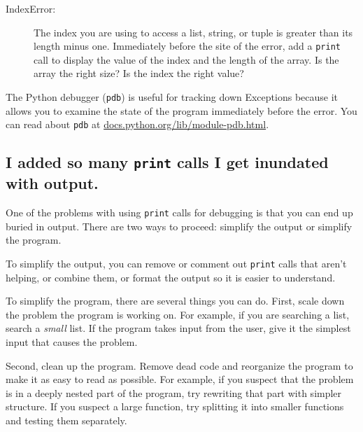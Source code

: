 \documentclass[10pt]{book}
\begin{document}
\begin{description}

\item[IndexError:] The index you are using
to access a list, string, or tuple is greater than
its length minus one.  Immediately before the site of the error,
add a {\tt print} call to display
the value of the index and the length of the array.
Is the array the right size?  Is the index the right value?


\end{description}


The Python debugger ({\tt pdb}) is useful for tracking down
Exceptions because it allows you to examine the state of the
program immediately before the error.  You can read
about {\tt pdb} at \url{docs.python.org/lib/module-pdb.html}.


\subsection{I added so many {\tt print} calls I get inundated with
output.}


One of the problems with using {\tt print} calls for debugging
is that you can end up buried in output.  There are two ways
to proceed: simplify the output or simplify the program.

To simplify the output, you can remove or comment out {\tt print}
calls that aren't helping, or combine them, or format
the output so it is easier to understand.

To simplify the program, there are several things you can do.  First,
scale down the problem the program is working on.  For example, if you
are searching a list, search a {\em small} list.  If the program takes
input from the user, give it the simplest input that causes the
problem.


Second, clean up the program.  Remove dead code and reorganize the
program to make it as easy to read as possible.  For example, if you
suspect that the problem is in a deeply nested part of the program,
try rewriting that part with simpler structure.  If you suspect a
large function, try splitting it into smaller functions and testing them
separately.
\end{document}
